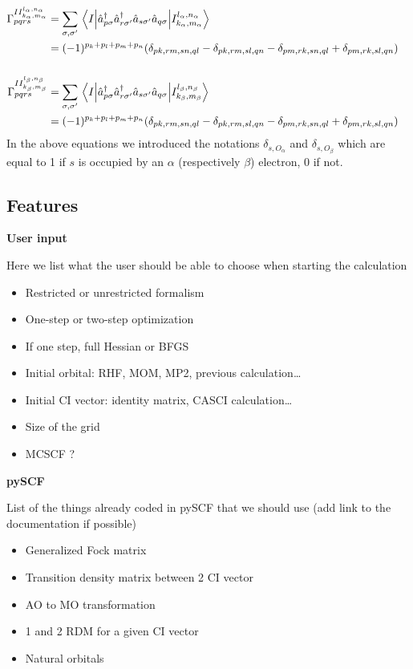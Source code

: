 \documentclass[11pt,a4paper]{article}
\newcommand{\kron}[1]{\delta_{#1}}
\newcommand{\oa}{O_{\alpha}}
\newcommand{\ob}{O_{\beta}}
\begin{document}
\begin{subequations}
\begin{align}
    \notag \\
    \Gamma_{pqrs}^{II_{k_\alpha,m_\alpha}^{l_\alpha,n_\alpha}} &= \sum_{\sigma,\sigma'}\mel{I}{\hat{a}_{p\sigma}^\dagger\hat{a}_{r\sigma'}^\dagger\hat{a}_{s\sigma'}\hat{a}_{q\sigma}}{I_{k_\alpha,m_\alpha}^{l_\alpha,n_\alpha}} \\
                       &= (-1)^{p_k+p_l+p_m+p_n}\mleft(\kron{pk,rm,sn,ql} - \kron{pk,rm,sl,qn} - \kron{pm,rk,sn,ql} + \kron{pm,rk,sl,qn}\mright) \notag\\
    \notag \\
    \Gamma_{pqrs}^{II_{k_\beta,m_\beta}^{l_\beta,n_\beta}} &= \sum_{\sigma,\sigma'}\mel{I}{\hat{a}_{p\sigma}^\dagger\hat{a}_{r\sigma'}^\dagger\hat{a}_{s\sigma'}\hat{a}_{q\sigma}}{I_{k_\beta,m_\beta}^{l_\beta,n_\beta}} \\
    &= (-1)^{p_k+p_l+p_m+p_n}\mleft(\kron{pk,rm,sn,ql} - \kron{pk,rm,sl,qn} - \kron{pm,rk,sn,ql} + \kron{pm,rk,sl,qn}\mright) \notag
  \end{align}
\end{subequations}
In the above equations we introduced the notations $\kron{s,\oa}$ and $\kron{s,\ob}$ which are equal to 1 if $s$ is occupied by an $\alpha$ (respectively $\beta$) electron, 0 if not.

\subsection{Features}

\noindent\textbf{User input}

Here we list what the user should be able to choose when starting the calculation
\begin{itemize}
\item Restricted or unrestricted formalism
\item One-step or two-step optimization
\item If one step, full Hessian or BFGS
\item Initial orbital: RHF, MOM, MP2, previous calculation\dots
\item Initial CI vector: identity matrix, CASCI calculation\dots
\item Size of the grid
\item MCSCF ?
\end{itemize}

\noindent\textbf{pySCF}

List of the things already coded in pySCF that we should use (add link to the documentation if possible)
\begin{itemize}
\item Generalized Fock matrix
\item Transition density matrix between 2 CI vector
\item AO to MO transformation
\item 1 and 2 RDM for a given CI vector
\item Natural orbitals
\end{itemize}
\end{document}
